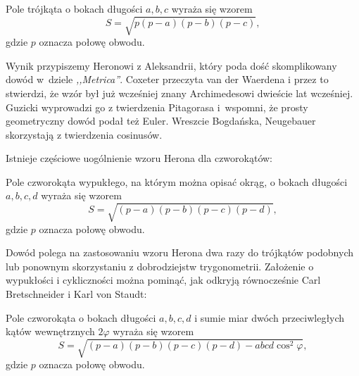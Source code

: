 %


\begin{proposition}
    Pole trójkąta o bokach długości $a, b, c$ wyraża się wzorem
    \begin{equation}
        S = \sqrt{p(p-a)(p-b)(p-c)},
    \end{equation}
    gdzie $p$ oznacza połowę obwodu.
\end{proposition}

Wynik przypiszemy Heronowi z Aleksandrii, który poda dość skomplikowany dowód w~dziele \emph{,,Metrica''}.
%
Coxeter \cite[s. 12]{coxeter_1991} przeczyta van der Waerdena \cite[s. 228, 277]{waerden_1961} i przez to stwierdzi, że wzór był już wcześniej znany Archimedesowi dwieście lat wcześniej.
%
Guzicki \cite[s. 165-169]{guzicki_2021} wyprowadzi go z twierdzenia Pitagorasa i~wspomni, że prosty geometryczny dowód podał też Euler.
%
Wreszcie Bogdańska, Neugebauer \cite[s. 92]{neugebauer_2018} skorzystają z twierdzenia cosinusów.

Istnieje częściowe uogólnienie wzoru Herona dla czworokątów:

\begin{proposition}
    \label{brahmagupta_formula}%
    Pole czworokąta wypukłego, na którym można opisać okrąg, o bokach długości $a, b, c, d$ wyraża się wzorem
    \begin{equation}
        S = \sqrt{(p-a)(p-b)(p-c)(p-d)},
    \end{equation}
    gdzie $p$ oznacza połowę obwodu.
\end{proposition}
%

Dowód polega na zastosowaniu wzoru Herona dwa razy do trójkątów podobnych lub ponownym skorzystaniu z dobrodziejstw trygonometrii.
Założenie o wypukłości i cykliczności można pominąć, jak odkryją równocześnie Carl Bretschneider i Karl von Staudt:
%
%

\begin{proposition}
    Pole czworokąta o bokach długości $a, b, c, d$ i sumie miar dwóch przeciwległych kątów wewnętrznych $2 \varphi$ wyraża się wzorem
    \begin{equation}
        S = \sqrt{(p-a)(p-b)(p-c)(p-d) - abcd \cos^2  \varphi},
    \end{equation}
    gdzie $p$ oznacza połowę obwodu.
\end{proposition}
%

